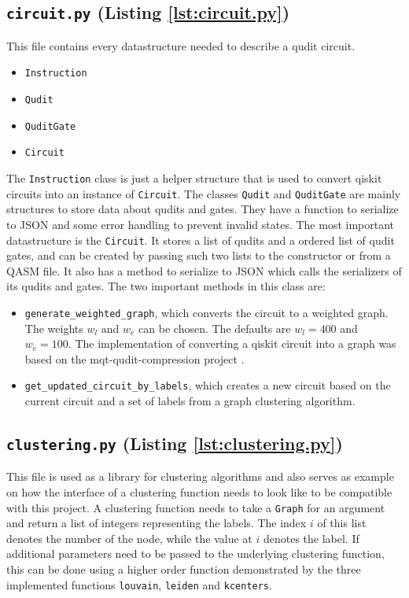 \subsection*{{\Large\texttt{circuit.py}} (Listing \ref{lst:circuit.py})}
  This file contains every datastructure needed to describe a qudit circuit.
  \begin{itemize}
    \item \texttt{Instruction}
    \item \texttt{Qudit}
    \item \texttt{QuditGate}
    \item \texttt{Circuit}
  \end{itemize}
  The \texttt{Instruction} class is just a helper structure that is used to convert qiskit circuits into an instance of \texttt{Circuit}. The classes \texttt{Qudit} and \texttt{QuditGate} are mainly structures to store data about qudits and gates. They have a function to serialize to JSON and some error handling to prevent invalid states. The most important datastructure is the \texttt{Circuit}. It stores a list of qudits and a ordered list of qudit gates, and can be created by passing such two lists to the constructor or from a QASM file. It also has a method to serialize to JSON which calls the serializers of its qudits and gates. The two important methods in this class are:
  \begin{itemize}
    \item \texttt{generate\_weighted\_graph}, which converts the circuit to a weighted graph. The weights $w_l$ and $w_e$ can be chosen. The defaults are $w_l=400$ and $w_e=100$. The implementation of converting a qiskit circuit into a graph was based on the mqt-qudit-compression project \cite{mato2023compression}.
    \item \texttt{get\_updated\_circuit\_by\_labels}, which creates a new circuit based on the current circuit and a set of labels from a graph clustering algorithm.
  \end{itemize}
\subsection*{{\Large\texttt{clustering.py}} (Listing \ref{lst:clustering.py})}
  This file is used as a library for clustering algorithms and also serves as example on how the interface of a clustering function needs to look like to be compatible with this project. A clustering function needs to take a \texttt{Graph} for an argument and return a list of integers representing the labels. The index $i$ of this list denotes the number of the node, while the value at $i$ denotes the label. If additional parameters need to be passed to the underlying clustering function, this can be done using a higher order function demonstrated by the three implemented functions \texttt{louvain}, \texttt{leiden} and \texttt{kcenters}.
